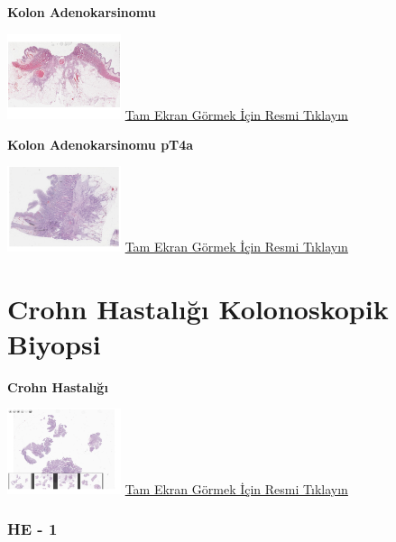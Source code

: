 \documentclass[
  letterpaper,
  DIV=11,
  numbers=noendperiod]{scrreprt}
\begin{document}
\textbf{Kolon Adenokarsinomu}

\href{https://images.patolojiatlasi.com/colon-adenocarcinoma/HE2.html}{\includegraphics[width=0.25\textwidth,height=\textheight]{./screenshots/thumbnail_colon-adenocarcinoma-2.png}}
\href{https://images.patolojiatlasi.com/colon-adenocarcinoma/HE2.html}{Tam
Ekran Görmek İçin Resmi Tıklayın}

\textbf{Kolon Adenokarsinomu pT4a}

\href{https://images.patolojiatlasi.com/colon-adenocarcinoma/HE3.html}{\includegraphics[width=0.25\textwidth,height=\textheight]{./screenshots/thumbnail_colon-adenocarcinoma-3.png}}
\href{https://images.patolojiatlasi.com/colon-adenocarcinoma/HE3.html}{Tam
Ekran Görmek İçin Resmi Tıklayın}

\hypertarget{sec-crohn-colonoscopic-biopsy}{%
\chapter{Crohn Hastalığı Kolonoskopik
Biyopsi}\label{sec-crohn-colonoscopic-biopsy}}

\textbf{Crohn Hastalığı}

\href{https://images.patolojiatlasi.com/crohn-colonoscopic-biopsy/all.html}{\includegraphics[width=0.25\textwidth,height=\textheight]{./screenshots/thumbnail_crohn-colonoscopic-biopsy-all.png}}
\href{https://images.patolojiatlasi.com/crohn-colonoscopic-biopsy/all.html}{Tam
Ekran Görmek İçin Resmi Tıklayın}

\hypertarget{he---1}{%
\subsection{HE - 1}\label{he---1}}
\end{document}
